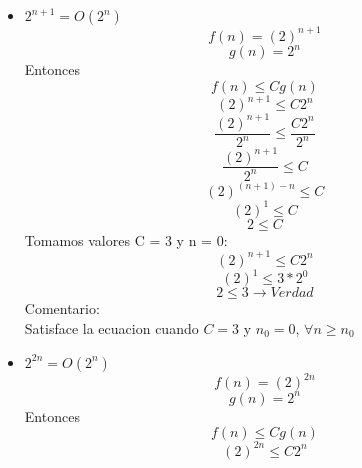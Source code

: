 \documentclass[10pt,a4paper]{article}
\begin{document}
\begin{itemize}
		\item $2^{n+1} = O(2^{n})$
			\begin{equation*}
				 f(n) = (2)^{n+1} 
			\end{equation*}
			\begin{equation*}
				 g(n) = 2^{n}
			\end{equation*}
			Entonces
			\begin{equation*}
				f(n) \leq C g(n)
			\end{equation*}
			\begin{equation*}
				(2)^{n+1}  \leq C 2^{n}
			\end{equation*}
			\begin{equation*}
				\frac{(2)^{n+1}}{2^{n}} \leq \frac{C 2^{n}}{2^{n}} 
			\end{equation*}
			\begin{equation*}
				\frac{(2)^{n+1}}{2^{n}} \leq C 
			\end{equation*}
			\begin{equation*}
				(2)^{(n+1)-n}\leq C 
			\end{equation*}
			\begin{equation*}
				(2)^{1}\leq C 
			\end{equation*}
			\begin{equation*}
				2\leq C 
			\end{equation*}
			Tomamos valores C = 3 y n = 0:
			\begin{equation*}
				(2)^{n+1}  \leq C 2^{n}
			\end{equation*}
			\begin{equation*}
				(2)^{1}  \leq 3*2^{0}
			\end{equation*}
			\begin{equation*}
				2 \leq 3 \rightarrow Verdad
			\end{equation*}
			Comentario: \\
			Satisface la ecuacion cuando $C = 3$ y $n_{0} = 0$, $\forall n \geq n_{0}$
		\item $2^{2n} = O(2^{n})$
			\begin{equation*}
				 f(n) = (2)^{2n} 
			\end{equation*}
			\begin{equation*}
				 g(n) = 2^{n}
			\end{equation*}
			Entonces
			\begin{equation*}
				f(n) \leq C g(n)
			\end{equation*}
			\begin{equation*}
				(2)^{2n}  \leq C 2^{n}

\end{equation*}
\end{itemize}
\end{document}
